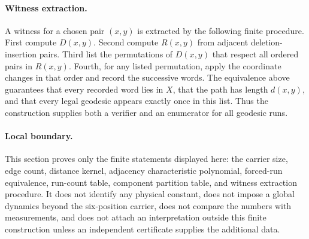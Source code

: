 \paragraph{Witness extraction.}
A witness for a chosen pair $(x,y)$ is extracted by the following finite procedure. First compute $D(x,y)$. Second compute $R(x,y)$ from adjacent deletion-insertion pairs. Third list the permutations of $D(x,y)$ that respect all ordered pairs in $R(x,y)$. Fourth, for any listed permutation, apply the coordinate changes in that order and record the successive words. The equivalence above guarantees that every recorded word lies in $X$, that the path has length $d(x,y)$, and that every legal geodesic appears exactly once in this list. Thus the construction supplies both a verifier and an enumerator for all geodesic runs.

\paragraph{Local boundary.}
This section proves only the finite statements displayed here: the carrier size, edge count, distance kernel, adjacency characteristic polynomial, forced-run equivalence, run-count table, component partition table, and witness extraction procedure. It does not identify any physical constant, does not impose a global dynamics beyond the six-position carrier, does not compare the numbers with measurements, and does not attach an interpretation outside this finite construction unless an independent certificate supplies the additional data.